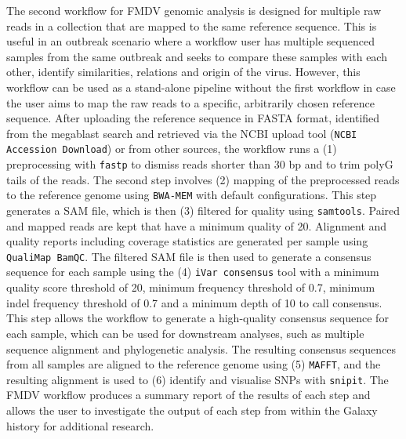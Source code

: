 The second workflow for \ac{FMDV} genomic analysis is designed for multiple raw reads in a collection that are mapped to the same reference sequence. This is useful in an outbreak scenario where a workflow user has multiple sequenced samples from the same outbreak and seeks to compare these samples with each other, identify similarities, relations and origin of the virus. However, this workflow can be used as a stand-alone pipeline without the first workflow in case the user aims to map the raw reads to a specific, arbitrarily chosen reference sequence. After uploading the reference sequence in FASTA format, identified from the megablast search and retrieved via the \ac{NCBI} upload tool (\texttt{NCBI Accession Download}) or from other sources, the workflow runs a (1) preprocessing with \texttt{fastp} to dismiss reads shorter than 30 bp and to trim polyG tails of the reads. The second step involves (2) mapping of the preprocessed reads to the reference genome using \texttt{BWA-MEM} with default configurations. This step generates a \ac{SAM} file, which is then (3) filtered for quality using \texttt{samtools}. Paired and mapped reads are kept that have a minimum quality of 20. Alignment and quality reports including coverage statistics are generated per sample using \texttt{QualiMap BamQC}. The filtered \ac{SAM} file is then used to generate a consensus sequence for each sample using the (4) \texttt{iVar consensus} tool with a minimum quality score threshold of 20, minimum frequency threshold of 0.7, minimum indel frequency threshold of 0.7 and a minimum depth of 10 to call consensus. This step allows the workflow to generate a high-quality consensus sequence for each sample, which can be used for downstream analyses, such as multiple sequence alignment and phylogenetic analysis. The resulting consensus sequences from all samples are aligned to the reference genome using (5) \texttt{MAFFT}, and the resulting alignment is used to (6) identify and visualise \acs{SNP}s with \texttt{snipit}. The \ac{FMDV} workflow produces a summary report of the results of each step and allows the user to investigate the output of each step from within the Galaxy history for additional research. 
